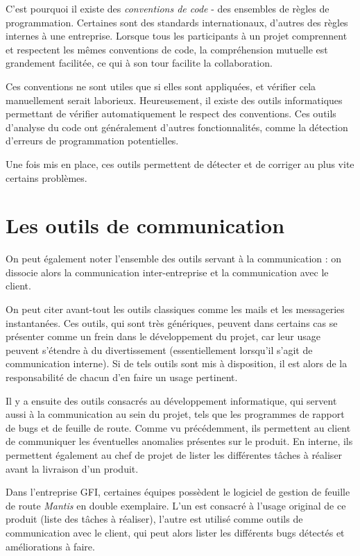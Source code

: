 C’est pourquoi il existe des \textit{conventions de code} - des ensembles de règles de programmation. Certaines sont des standards internationaux, d’autres des règles internes à une entreprise. Lorsque tous les participants à un projet comprennent et respectent les mêmes conventions de code, la compréhension mutuelle est grandement facilitée, ce qui à son tour facilite la collaboration.

Ces conventions ne sont utiles que si elles sont appliquées, et vérifier cela manuellement serait laborieux. Heureusement, il existe des outils informatiques permettant de vérifier automatiquement le respect des conventions. Ces outils d’analyse du code ont généralement d’autres fonctionnalités, comme la détection d’erreurs de programmation potentielles.

Une fois mis en place, ces outils permettent de détecter et de corriger au plus vite certains problèmes.

\section{Les outils de communication}

On peut également noter l'ensemble des outils servant à la communication : on dissocie alors la communication inter-entreprise et la communication avec le client.

On peut citer avant-tout les outils classiques comme les mails et les messageries instantanées. Ces outils, qui sont très génériques, peuvent dans certains cas se présenter comme un frein dans le développement du projet, car leur usage peuvent s'étendre à du divertissement (essentiellement lorsqu'il s'agit de communication interne). Si de tels outils sont mis à disposition, il est alors de la responsabilité de chacun d'en faire un usage pertinent.

Il y a ensuite des outils consacrés au développement informatique, qui servent aussi à la communication au sein du projet, tels que les programmes de rapport de bugs et de feuille de route. Comme vu précédemment, ils permettent au client de communiquer les éventuelles anomalies présentes sur le produit. En interne, ils permettent également au chef de projet de lister les différentes tâches à réaliser avant la livraison d'un produit.

\begin{app}
Dans l'entreprise GFI, certaines équipes possèdent le logiciel de gestion de feuille de route \textit{Mantis} en double exemplaire. L'un est consacré à l'usage original de ce produit (liste des tâches à réaliser), l'autre est utilisé comme outils de communication avec le client, qui peut alors lister les différents bugs détectés et améliorations à faire.
\end{app}

